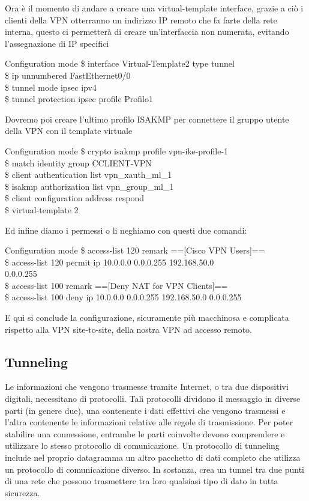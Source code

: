 Ora è il momento di andare a creare una virtual-template interface, grazie a ciò i clienti della VPN otterranno un indirizzo IP remoto che fa farte della rete interna, questo ci permetterà di creare un’interfaccia non numerata, evitando l’assegnazione di IP specifici 

\begin{fcmds}{Configuration mode}
    \$ interface Virtual-Template2 type tunnel\\
    \$ ip unnumbered FastEthernet0/0\\
    \$ tunnel mode ipsec ipv4\\
    \$ tunnel protection ipsec profile Profilo1
\end{fcmds}

Dovremo poi creare l’ultimo profilo ISAKMP per connettere il gruppo utente della VPN con il template virtuale

\begin{fcmds}{Configuration mode}
    \$ crypto isakmp profile vpn-ike-profile-1\\
    \$ match identity group CCLIENT-VPN\\
    \$ client authentication list vpn\_xauth\_ml\_1\\
    \$ isakmp authorization list vpn\_group\_ml\_1\\
    \$ client configuration address respond\\
    \$ virtual-template 2
\end{fcmds}

Ed infine diamo i permessi o li neghiamo con questi due comandi:

\begin{fcmds}{Configuration mode}
    \$ access-list 120 remark ==[Cisco VPN Users]==\\
    \$ access-list 120 permit ip 10.0.0.0 0.0.0.255 192.168.50.0\\
    0.0.0.255\\
    \$ access-list 100 remark ==[Deny NAT for VPN Clients]==\\
    \$ access-list 100 deny ip 10.0.0.0 0.0.0.255 192.168.50.0 0.0.0.255
\end{fcmds}

E qui si conclude la configurazione, sicuramente più macchinosa e complicata rispetto alla VPN site-to-site, della nostra VPN ad accesso remoto.

\subsection{Tunneling}
Le informazioni che vengono trasmesse tramite Internet, o tra due dispositivi digitali, necessitano di protocolli. Tali protocolli dividono il messaggio in diverse parti (in genere due), una contenente i dati effettivi che vengono trasmessi e l'altra contenente le informazioni relative alle regole di trasmissione. Per poter stabilire una connessione, entrambe le parti coinvolte devono comprendere e utilizzare lo stesso protocollo di comunicazione. Un protocollo di tunneling include nel proprio datagramma un altro pacchetto di dati completo che utilizza un protocollo di comunicazione diverso. In sostanza, crea un tunnel tra due punti di una rete che possono trasmettere tra loro qualsiasi tipo di dato in tutta sicurezza.

